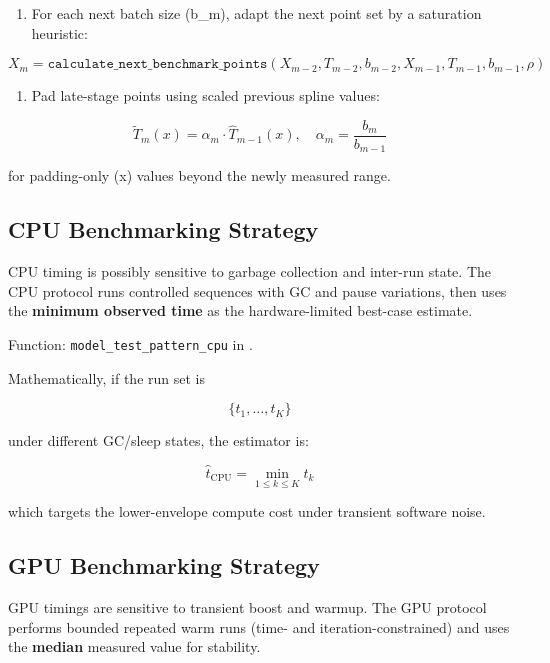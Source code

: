\documentclass{article}
\providecommand{\tightlist}{\setlength{\itemsep}{0pt}\setlength{\parskip}{0pt}}
\begin{document}
\begin{enumerate}
\def\labelenumi{\arabic{enumi}.}
\setcounter{enumi}{2}
\tightlist
\item
  For each next batch size (b\_m), adapt the next point set by a
  saturation heuristic:
\end{enumerate}

\[
X_{m}=\texttt{calculate\_next\_benchmark\_points}(
X_{m-2},T_{m-2},b_{m-2},
X_{m-1},T_{m-1},b_{m-1},\rho)
\]

\begin{enumerate}
\def\labelenumi{\arabic{enumi}.}
\setcounter{enumi}{3}
\tightlist
\item
  Pad late-stage points using scaled previous spline values:
\end{enumerate}

\[
\tilde{T}_{m}(x)=\alpha_m \cdot \hat{T}_{m-1}(x),\quad
\alpha_m=\frac{b_m}{b_{m-1}}
\]

for padding-only (x) values beyond the newly measured range.

\hypertarget{51-cpu-benchmarking-strategy}{%
\subsection{CPU Benchmarking
Strategy}\label{51-cpu-benchmarking-strategy}}

CPU timing is possibly sensitive to garbage collection and inter-run
state. The CPU protocol runs controlled sequences with GC and pause
variations, then uses the \textbf{minimum observed time} as the
hardware-limited best-case estimate.

Function: \texttt{model\_test\_pattern\_cpu} in
.

Mathematically, if the run set is

\[
\{t_1,\dots,t_K\}
\]

under different GC/sleep states, the estimator is:

\[
\hat{t}_{\mathrm{CPU}}=\min_{1\le k\le K} t_k
\]

which targets the lower-envelope compute cost under transient software
noise.

\hypertarget{52-gpu-benchmarking-strategy}{%
\subsection{GPU Benchmarking
Strategy}\label{52-gpu-benchmarking-strategy}}

GPU timings are sensitive to transient boost and warmup. The GPU
protocol performs bounded repeated warm runs (time- and
iteration-constrained) and uses the \textbf{median} measured value for
stability.
\end{document}
